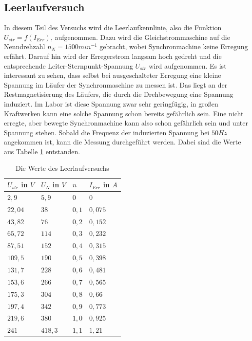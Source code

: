 \documentclass{report}
\begin{document}
\subsection{Leerlaufversuch}

In diesem Teil des Versuchs wird die Leerlaufkennlinie, also die Funktion $U_{str} = f(I_{Err})$, aufgenommen. Dazu wird die Gleichstrommaschine auf die Nenndrehzahl $n_{N} = 1500min^{-1}$ gebracht, wobei Synchronmachine keine Erregung erfährt. Darauf hin wird der Erregerstrom langsam hoch gedreht und die entsprechende Leiter-Sternpunkt-Spannung $U_{str}$ wird aufgenommen. Es ist interessant zu sehen, dass selbst bei ausgeschalteter Erregung eine kleine Spannung im Läufer der Synchronmaschine zu messen ist. Das liegt an der Restmagnetisierung des Läufers, die durch die Drehbewegung eine Spannung induziert. Im Labor ist diese Spannung zwar sehr geringfügig, in großen Kraftwerken kann eine solche Spannung schon bereits gefährlich sein. Eine nicht erregte, aber bewegte Synchronmachine kann also schon gefährlich sein und unter Spannung stehen. Sobald die Frequenz der induzierten Spannung bei $50Hz$ angekommen ist, kann die Messung durchgeführt werden. Dabei sind die Werte aus Tabelle \ref{tab:leerlaufversuch} entstanden.

\begin{table}[!ht]
	\centering
	\begin{tabular}{llll}
		\hline
		$U_{str}$ in $V$ & $U_{N}$ in $V$ & $n$   & $I_{Err}$ in $A$ \\ \hline
		$2,9$            & $5,9$          & $0$   & $0$              \\
		$22,04$          & $38$           & $0,1$ & $0,075$          \\
		$43,82$          & $76$           & $0,2$ & $0,152$          \\
		$65,72$          & $114$          & $0,3$ & $0,232$          \\
		$87,51$          & $152$          & $0,4$ & $0,315$          \\
		$109,5$          & $190$          & $0,5$ & $0,398$          \\
		$131,7$          & $228$          & $0,6$ & $0,481$          \\
		$153,6$          & $266$          & $0,7$ & $0,565$          \\
		$175,3$          & $304$          & $0,8$ & $0,66$           \\
		$197,4$          & $342$          & $0,9$ & $0,773$          \\
		$219,6$          & $380$          & $1,0$ & $0,925$          \\
		$241$            & $418,3$        & $1,1$ & $1,21$           \\ \hline
	\end{tabular}
	\caption{Die Werte des Leerlaufversuchs}
	\label{tab:leerlaufversuch}
\end{table}
\end{document}
